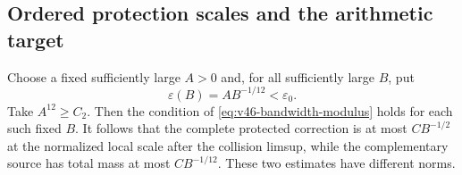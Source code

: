 \subsection{Ordered protection scales and the arithmetic target}
Choose a fixed sufficiently large $A>0$ and, for all sufficiently large
$B$, put
\begin{equation}\label{eq:v46-ordered-protection}
 \varepsilon(B)=A B^{-1/12}<\varepsilon_0.
\end{equation}
Take $A^{12}\ge C_2$. Then the condition of
\eqref{eq:v46-bandwidth-modulus} holds for each such fixed $B$.
It follows that the complete protected correction is at most
$CB^{-1/2}$ at the normalized local scale after the collision limsup,
while the complementary source has total mass at most $CB^{-1/12}$.
These two estimates have different norms.

